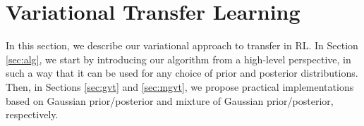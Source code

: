 \documentclass{article}
\begin{document}
%

\section{Variational Transfer Learning}

In this section, we describe our variational approach to transfer in RL. In Section \ref{sec:alg}, we start by introducing our algorithm from a high-level perspective, in such a way that it can be used for any choice of prior and posterior distributions. Then, in Sections \ref{sec:gvt} and \ref{sec:mgvt}, we propose practical implementations based on Gaussian prior/posterior and mixture of Gaussian prior/posterior, respectively.
\end{document}
